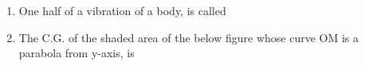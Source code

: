 \documentclass[11pt,a4paper]{article}
\begin{document}
\begin{enumerate}
\item{One half of a vibration of a body, is called}
\\
\item{The C.G. of the shaded area of the below figure whose curve OM is a parabola from y-axis, is \\

}
\end{enumerate}
\end{document}
